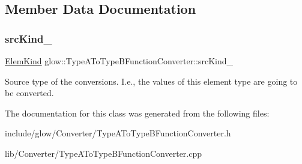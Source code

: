 \subsection{Member Data Documentation}
\mbox{\label{classglow_1_1_type_a_to_type_b_function_converter_a984bdf4b025f79a0bee38afb767cd8bd}} 
\subsubsection{\texorpdfstring{src\+Kind\+\_\+}{srcKind\_}}
{\footnotesize\ttfamily \hyperlink{namespaceglow_ab92e14a94329daf4083db670e95fbcdf}{Elem\+Kind} glow\+::\+Type\+A\+To\+Type\+B\+Function\+Converter\+::src\+Kind\+\_\+\hspace{0.3cm}{\ttfamily [protected]}}

Source type of the conversions. I.\+e., the values of this element type are going to be converted. 

The documentation for this class was generated from the following files\+:\begin{DoxyCompactItemize}
\item 
include/glow/\+Converter/Type\+A\+To\+Type\+B\+Function\+Converter.\+h\item 
lib/\+Converter/Type\+A\+To\+Type\+B\+Function\+Converter.\+cpp\end{DoxyCompactItemize}
